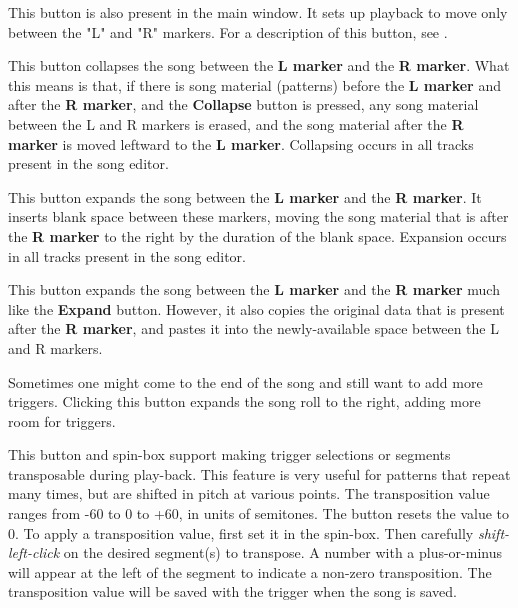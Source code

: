    This button is also present in the main window.
   It sets up playback to move only between the "L" and "R" markers.
   For a description of this button, see
   .

   This button collapses the song between the \textbf{L marker} and the
   \textbf{R marker}.
   What this means is that, if there is song material (patterns) before the
   \textbf{L marker} and after the \textbf{R marker},
   and the \textbf{Collapse} button is
   pressed, any song material between the L and R markers is erased, and
   the song material after the \textbf{R marker} is moved leftward to
   the \textbf{L marker}.
   Collapsing occurs in all tracks present in the song editor.

   This button expands the song between the
   \textbf{L marker} and the \textbf{R marker}.
   It inserts blank space between these markers, moving the song material
   that is after the \textbf{R marker}
   to the right by the duration of the blank space.
   Expansion occurs in all tracks present in the song editor.

   This button expands the song between the \textbf{L marker} and the
   \textbf{R marker} much like the \textbf{Expand} button.
   However, it also copies the original data that is present after the
   \textbf{R marker}, and pastes it into the newly-available space between
   the L and R markers.

   Sometimes one might come to the end of the song and still want to
   add more triggers.
   Clicking this button expands the song roll to the right, adding
   more room for triggers.

   This button and spin-box support making trigger selections or segments
   transposable during play-back.  This feature is very useful
   for patterns that repeat many times, but are shifted in pitch at various
   points.
   The transposition value ranges from -60 to 0 to +60, in units of semitones.
   The button resets the value to 0.
   To apply a transposition value, first set it in the spin-box.
   Then carefully \textsl{shift-left-click}
   on the desired segment(s) to transpose.
   A number with a plus-or-minus will appear at the left of the segment to
   indicate a non-zero transposition.
   The transposition value will be saved with the trigger when the song is
   saved.


